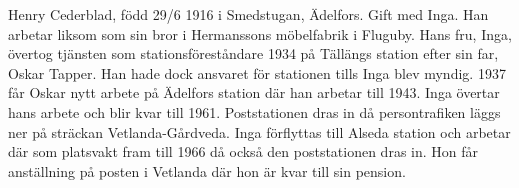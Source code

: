 Henry Cederblad, född 29/6 1916 i Smedstugan, Ädelfors. Gift med Inga.
Han arbetar liksom som sin bror i Hermanssons möbelfabrik i Fluguby.
Hans fru, Inga, övertog tjänsten som stationsföreståndare 1934 på Tällängs station efter sin far, Oskar Tapper. Han hade dock ansvaret för stationen tills Inga blev myndig. 1937 får Oskar nytt arbete på Ädelfors station där han arbetar till 1943. Inga övertar hans arbete och blir kvar till 1961. Poststationen dras in då persontrafiken läggs ner på sträckan Vetlanda-Gårdveda. Inga förflyttas till Alseda station och arbetar där som platsvakt fram till 1966 då också den poststationen dras in. Hon får anställning på posten i Vetlanda där hon är kvar till sin pension.

\bye
